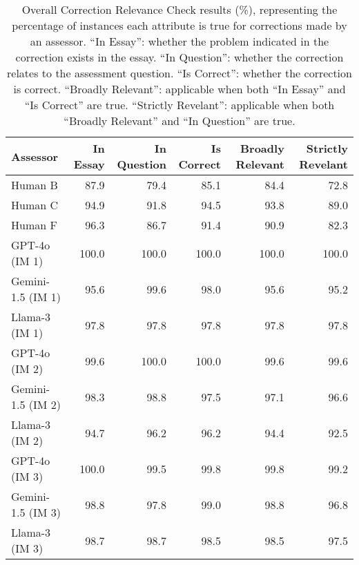 \begin{table*}[]
    \centering
    \small

\begin{tabular}{lrrrrr}
\toprule
         Assessor &  In Essay &  In Question &  Is Correct &  Broadly Relevant &  Strictly Revelant \\
\midrule
               Human B &     87.9 &        79.4 &       85.1 &           84.4 &            72.8 \\
               Human C &     94.9 &        91.8 &       94.5 &           93.8 &            89.0 \\
               Human F &     96.3 &        86.7 &       91.4 &           90.9 &            82.3 \\ \midrule
    GPT-4o (IM 1) &    100.0 &       100.0 &      100.0 &          100.0 &           100.0 \\
Gemini-1.5 (IM 1) &     95.6 &        99.6 &       98.0 &           95.6 &            95.2 \\
   Llama-3 (IM 1) &     97.8 &        97.8 &       97.8 &           97.8 &            97.8 \\ \midrule
    GPT-4o (IM 2) &     99.6 &       100.0 &      100.0 &           99.6 &            99.6 \\
Gemini-1.5 (IM 2) &     98.3 &        98.8 &       97.5 &           97.1 &            96.6 \\
   Llama-3 (IM 2) &     94.7 &        96.2 &       96.2 &           94.4 &            92.5 \\ \midrule
    GPT-4o (IM 3) &    100.0 &        99.5 &       99.8 &           99.8 &            99.2 \\
Gemini-1.5 (IM 3) &     98.8 &        97.8 &       99.0 &           98.8 &            96.8 \\
   Llama-3 (IM 3) &     98.7 &        98.7 &       98.5 &           98.5 &            97.5 \\
\bottomrule
\end{tabular}
    
    \caption{Overall Correction Relevance Check results (\%), representing the percentage of instances each attribute is true for corrections made by an assessor. ``In Essay'': whether the problem indicated in the correction exists in the essay. ``In Question'': whether the correction relates to the assessment question. ``Is Correct'': whether the correction is correct. ``Broadly Relevant'': applicable when both ``In Essay'' and ``Is Correct'' are true. ``Strictly Revelant'': applicable when both ``Broadly Relevant'' and ``In Question'' are true.}
    \label{tab:overallRelevanceCheckResults}
\end{table*}


